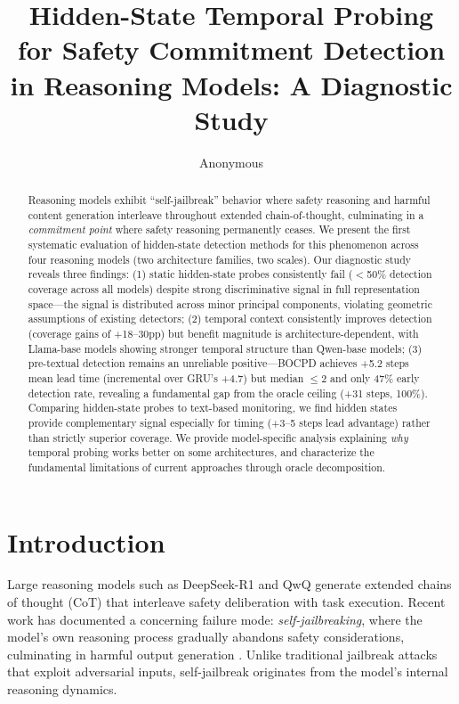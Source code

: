 \documentclass[11pt,a4paper]{article}
\title{Hidden-State Temporal Probing for Safety Commitment Detection in Reasoning Models: A Diagnostic Study}
\author{Anonymous}
\begin{document}
\maketitle

\begin{abstract}
Reasoning models exhibit ``self-jailbreak'' behavior where safety reasoning and harmful content generation interleave throughout extended chain-of-thought, culminating in a \emph{commitment point} where safety reasoning permanently ceases. We present the first systematic evaluation of hidden-state detection methods for this phenomenon across four reasoning models (two architecture families, two scales). Our diagnostic study reveals three findings: (1) static hidden-state probes consistently fail ($<$50\% detection coverage across all models) despite strong discriminative signal in full representation space---the signal is distributed across minor principal components, violating geometric assumptions of existing detectors; (2) temporal context consistently improves detection (coverage gains of +18--30pp) but benefit magnitude is architecture-dependent, with Llama-base models showing stronger temporal structure than Qwen-base models; (3) pre-textual detection remains an unreliable positive---BOCPD achieves +5.2 steps mean lead time (incremental over GRU's +4.7) but median $\leq$2 and only 47\% early detection rate, revealing a fundamental gap from the oracle ceiling (+31 steps, 100\%). Comparing hidden-state probes to text-based monitoring, we find hidden states provide complementary signal especially for timing (+3--5 steps lead advantage) rather than strictly superior coverage. We provide model-specific analysis explaining \emph{why} temporal probing works better on some architectures, and characterize the fundamental limitations of current approaches through oracle decomposition.
\end{abstract}

\section{Introduction}

Large reasoning models such as DeepSeek-R1 and QwQ generate extended chains of thought (CoT) that interleave safety deliberation with task execution. Recent work has documented a concerning failure mode: \emph{self-jailbreaking}, where the model's own reasoning process gradually abandons safety considerations, culminating in harmful output generation \cite{guan2025selfJailbreak}. Unlike traditional jailbreak attacks that exploit adversarial inputs, self-jailbreak originates from the model's internal reasoning dynamics.
\end{document}
